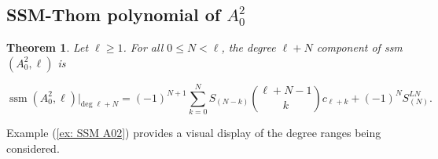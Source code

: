 \documentclass[11pt]{article}
\theoremstyle{plain}
\newtheorem{theorem}[fact]{Theorem}
\theoremstyle{definition}
\theoremstyle{definition}
\newcounter{equation}
\DeclareMathOperator{\ssm}{ssm}
\begin{document}
\subsection{SSM-Thom polynomial of $A_0^2$}

\begin{theorem}\label{SSM of A02}
Let $\ell\geq1$. For all $0\leq N<\ell$, the degree $\ell+N$ component of ssm$(A_0^2,\ell)$ is

\begin{equation} \label{eq1}
\ssm(A_0^2,\ell)\Big|_{\text{deg }\ell+N}=
(-1)^{N+1}\sum_{k=0}^NS_{(N-k)}{\ell+N-1\choose k}c_{\ell+k}+(-1)^{N} S^{LN}_{(N)}.
\end{equation}

\end{theorem}

Example (\ref{ex: SSM A02}) provides a visual display of the degree ranges being considered. 
\end{document}
